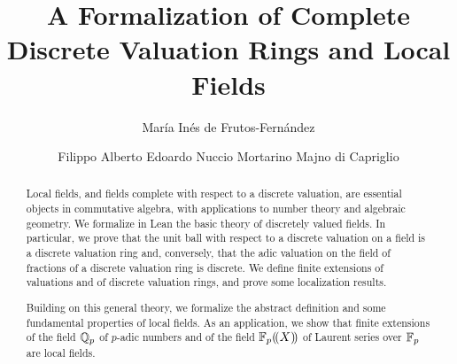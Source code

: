 \documentclass[sigplan,screen]{acmart}
\begin{document}

\title{A Formalization of Complete Discrete Valuation Rings and Local Fields}





\author{María Inés de Frutos-Fernández}

\author{Filippo Alberto Edoardo Nuccio Mortarino Majno di Capriglio}
\authornotemark[1]


\renewcommand{\shortauthors}{M.~I.~de Frutos-Fernández and F.~A.~E.~Nuccio Mortarino Majno di Capriglio}

\begin{abstract}
  Local fields, and fields complete with respect to a discrete valuation, are essential objects in commutative algebra, with applications to number theory and algebraic geometry. We formalize in Lean the basic theory of discretely valued fields. In particular, we prove that the unit ball with respect to a discrete valuation on a field is a discrete valuation ring and, conversely, that the adic
  valuation on the field of fractions of a discrete valuation ring is discrete. We define finite extensions of valuations and of discrete valuation
  rings, and prove some localization results. 
  
  Building on this general theory, we formalize the abstract definition and some fundamental properties of local fields. As an application, we show that finite extensions of the field $\mathbb{Q}_p$ of $p$-adic numbers and of the field ${\mathbb{F}_{p}}(\!(X)\!)$ of Laurent series over $\mathbb{F}_{p}$ are local fields. 
  
\end{abstract}
\end{document}
